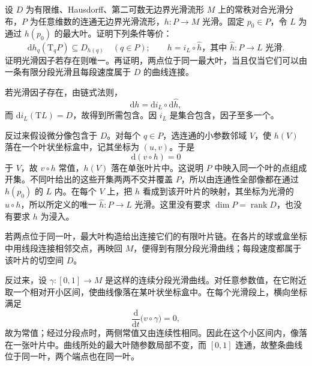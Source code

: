 \begin{exercise}\label{g1:ex:maps-tangent-to-leaves}
	设 \(D\) 为有限维、Hausdorff、第二可数无边界光滑流形 \(M\) 上的常秩对合光滑分布，\(P\) 为任意维数的连通无边界光滑流形，\(h:P\to M\) 光滑。固定 \(p_0\in P\)，令 \(L\) 为通过 \(h(p_0)\) 的最大叶。证明下列条件等价：
	\[
		\mathrm{d}h_q(\mathrm{T}_qP)\subseteq D_{h(q)}\quad(q\in P);
		\qquad
		h=i_L\circ\widehat h\text{，其中 }\widehat h:P\to L\text{ 光滑}.
	\]
	证明光滑因子若存在则唯一。再证明，两点位于同一最大叶，当且仅当它们可以由一条有限分段光滑且每段速度属于 \(D\) 的曲线连接。
\end{exercise}
\begin{solution}
	若光滑因子存在，由链式法则，
	\[
		\mathrm{d}h=\mathrm{d}i_L\circ\mathrm{d}\widehat h,
	\]
	而 \(\mathrm{d}i_L(\mathrm{T}L)=D\)，故得到所需包含。因 \(i_L\) 是集合包含，因子至多一个。

	反过来假设微分像包含于 \(D\)。对每个 \(q\in P\)，选连通的小参数邻域 \(V\)，使 \(h(V)\) 落在一个叶状坐标盒中，记其坐标为 \((u,v)\)。于是
	\[
		\mathrm{d}(v\circ h)=0
	\]
	于 \(V\)，故 \(v\circ h\) 常值，\(h(V)\) 落在单张叶片中。这说明 \(P\) 中映入同一个叶的点组成开集。不同叶给出的这些开集两两不交并覆盖 \(P\)，所以由连通性全部像都在通过 \(h(p_0)\) 的 \(L\) 内。在每个 \(V\) 上，把 \(h\) 看成到该开叶片的映射，其坐标为光滑的 \(u\circ h\)，所以所定义的唯一 \(\widehat h:P\to L\) 光滑。这里没有要求 \(\dim P=\operatorname{rank}D\)，也没有要求 \(h\) 为浸入。

	若两点位于同一叶，最大叶构造给出连接它们的有限叶片链。在各片的球或盒坐标中用线段连接相邻交点，再映回 \(M\)，便得到有限分段光滑曲线；每段速度都属于该叶片的切空间 \(D\)。

	反过来，设 \(\gamma:[0,1]\to M\) 是这样的连续分段光滑曲线。对任意参数值，在它附近取一个相对开小区间，使曲线像落在某叶状坐标盒中。在每个光滑段上，横向坐标满足
	\[
		\frac{\mathrm{d}}{\mathrm{d}t}\bigl(v\circ\gamma\bigr)=0,
	\]
	故为常值；经过分段点时，两侧常值又由连续性相同。因此在这个小区间内，像落在一张叶片中。曲线所处的最大叶随参数局部不变，而 \([0,1]\) 连通，故整条曲线位于同一叶，两个端点也在同一叶。
\end{solution}

